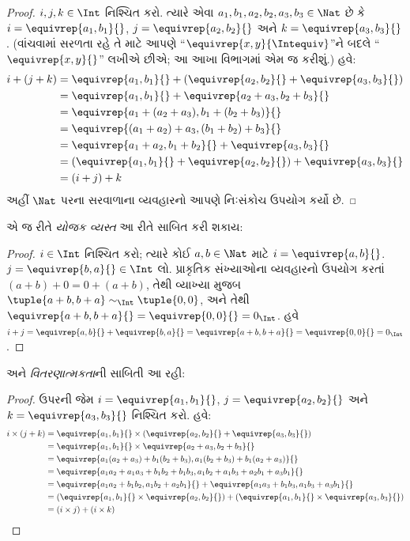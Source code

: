 \begin{proof}
$i, j, k \in \Int$ નિશ્ચિત કરો. ત્યારે એવા $a_1, b_1, a_2, b_2, a_3, b_3 \in
\Nat$ છે કે $i = \equivrep{a_1, b_1}{}$, $j =
\equivrep{a_2,b_2}{}$ અને $k = \equivrep{a_3, b_3}{}$. (વાંચવામાં
સરળતા રહે તે માટે આપણે ``$\equivrep{x, y}{\Intequiv}$''ને બદલે
``$\equivrep{x, y}{}$'' લખીએ છીએ; આ આખા વિભાગમાં એમ જ કરીશું.) હવે:
\begin{align*}
	i + (j + k) &= \equivrep{a_1, b_1}{}+(\equivrep{a_2, b_2}{} + \equivrep{a_3, b_3}{}) \\
	&= \equivrep{a_1,  b_1}{} + \equivrep{a_2+a_3, b_2+b_3}{}\\
	&= \equivrep{a_1 + (a_2 + a_3), b_1 + (b_2 + b_3)}{}\\
	&= \equivrep{(a_1 + a_2) + a_3, (b_1 + b_2) + b_3}{}\\
	&= \equivrep{a_1 + a_2, b_1 + b_2}{} + \equivrep{a_3, b_3}{}\\
	&= (\equivrep{a_1, b_1}{} + \equivrep{a_2, b_2}{}) + \equivrep{a_3, b_3}{}\\
	&= (i+j) + k
\end{align*}
અહીં $\Nat$ પરના સરવાળાના વ્યવહારનો આપણે નિઃસંકોચ ઉપયોગ કર્યો છે.
\end{proof}

એ જ રીતે \emph{યોજક વ્યસ્ત} આ રીતે સાબિત કરી શકાય:

\begin{proof}
$i \in \Int$ નિશ્ચિત કરો; ત્યારે કોઈ $a,b \in \Nat$ માટે $i =
\equivrep{a,b}{}$. $j = \equivrep{b,a}{} \in \Int$ લો. પ્રાકૃતિક
સંખ્યાઓના વ્યવહારનો ઉપયોગ કરતાં $(a+b) + 0 = 0 + (a+b)$, તેથી
વ્યાખ્યા મુજબ $\tuple{a+b, b+a} \sim_\Int \tuple{0,0}$, અને તેથી
$\equivrep{a+b, b+a}{} = \equivrep{0, 0}{} = 0_\Int$. હવે $i + j =
\equivrep{a,b}{}+\equivrep{b,a}{}=\equivrep{a+b, b+a}{}= \equivrep{0,
0}{} = 0_\Int$.
\end{proof}

અને \emph{વિતરણાત્મકતા}ની સાબિતી આ રહી:

\begin{proof}
ઉપરની જેમ $i = \equivrep{a_1, b_1}{}$, $j =
\equivrep{a_2,b_2}{}$ અને $k = \equivrep{a_3, b_3}{}$ નિશ્ચિત કરો. હવે:
\begin{align*}
	i \times (j + k)
	&= \equivrep{a_1, b_1}{} \times (\equivrep{a_2,b_2}{} + \equivrep{a_3, b_3}{})\\
	&= \equivrep{a_1, b_1}{} \times \equivrep{a_2 + a_3,b_2+b_3}{}\\
	&= \equivrep{a_1  (a_2 + a_3) + b_1  (b_2+b_3), a_1  (b_2 + b_3) + b_1 (a_2 + a_3)}{}\\
	&= \equivrep{a_1 a_2 + a_1a_3 + b_1 b_2+b_1b_3, a_1 b_2 + a_1b_3 + a_2b_1 + a_3b_1}{}\\
	&= \equivrep{a_1a_2 + b_1b_2, a_1b_2 + a_2b_1}{} + \equivrep{a_1a_3 + b_1b_3, a_1b_3 + a_3b_1}{}\\
	&= (\equivrep{a_1, b_1}{} \times \equivrep{a_2,b_2}{}) + (\equivrep{a_1, b_1}{} \times  \equivrep{a_3, b_3}{})\\
	&= (i \times j) + (i \times k)
\end{align*}
\end{proof}

